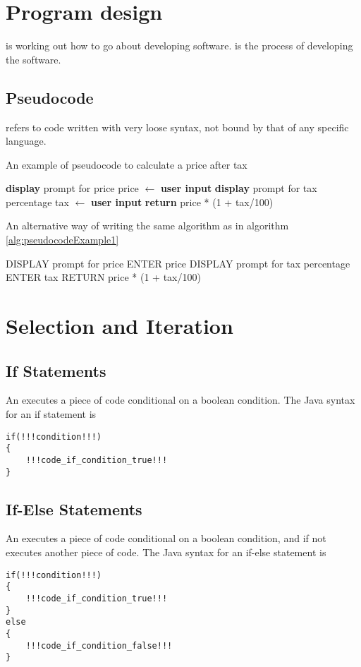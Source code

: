 \documentclass[11pt]{article}
\begin{document}
\pagebreak
\section{Program design}
\begin{defi}
     is working out how to go about developing software.  is the process of developing the software.
\end{defi}
\subsection{Pseudocode}
 refers to code written with very loose syntax, not bound by that of any specific language.
\begin{algorithm}
    \caption{An example of pseudocode to calculate a price after tax}
    \label{alg:pseudocodeExample1}
    \textbf{display} prompt for price\;
    price $\gets$ \textbf{user input}\;
    \textbf{display} prompt for tax percentage\;
    tax $\gets$ \textbf{user input}\;
    \textbf{return} price * (1 + tax/100)\;
\end{algorithm}
\begin{algorithm}
    \caption{An alternative way of writing the same algorithm as in algorithm \ref{alg:pseudocodeExample1}}
    DISPLAY prompt for price\;
    ENTER price\;
    DISPLAY prompt for tax percentage\;
    ENTER tax\;
    RETURN price * (1 + tax/100)\;
\end{algorithm}
\pagebreak


\section{Selection and Iteration}
\subsection{If Statements}
An  executes a piece of code conditional on a boolean condition. The Java syntax for an if statement is
\vspace{-20pt}
\begin{lstlisting}[style=javaSyntax]
if(!!!condition!!!)
{
    !!!code_if_condition_true!!!
}
\end{lstlisting}
\subsection{If-Else Statements}
An  executes a piece of code conditional on a boolean condition, and if not executes another piece of code. The Java syntax for an if-else statement is
\vspace{-20pt}
\begin{lstlisting}[style=javaSyntax]
if(!!!condition!!!)
{
    !!!code_if_condition_true!!!
}
else
{
    !!!code_if_condition_false!!!
}
\end{lstlisting}
\end{document}
